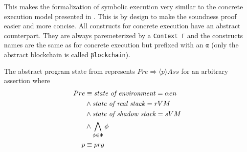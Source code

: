 \begin{comment}
These rules never affect the goal formula to be asserted, and because
(which must always be given), and $Ass$ can be any formula.
Our construct specifys $Pre \Longrightarrow \langle p \rangle$ but not $Ass$ since it
neither changes, nor has any implications for the validity of our rules
\draft{other than the premisse holds with $Ass$ \emph{iff} the conclusion holds with it (i guess)}.

This matches the sequent rule (R8) from \todo{cite lecture notes 2010}
for functional Michelson instructions, since here $x$ will be the new top stack element,
which our DL always represents with a new variable, thus $\phi_x^{\hat{x}} \equiv \phi$.
\todo{not sure about control flow instructions \ldots}

We will proof the soundness of these rules by showing that
if an interpretation for $Pre$ is a valid interpretation for a concrete execution state
with $i ; p$ left to be executed
(i.e. stack values match and $Pre$ otherwise doesn't contradict itself),
we can give an extension of that interpretation
such that $I \land Pre'$ is a valid interpretation of the concrete state after execution of $i$.

Since the extension of the interpretation is only for possible new variables that are not present
in $Ass$, it follows from our soundness proof \draft{that our calculus is sound \ldots}.
\end{comment}

This makes the formalization of symbolic execution very similar to the concrete execution model
presented in .
This is by design to make the soundness proof easier and more concise.
All constructs for concrete execution have an abstract counterpart.
They are always paremeterized by a \verb/Context Γ/ and the constructs names are the same as for
concrete execution but prefixed with an \verb/α/
(only the abstract blockchain is called \verb/βlockchain/).

The abstract program state from 
represents $Pre \Longrightarrow \langle p \rangle Ass$ for an arbitrary assertion where
\begin{align*}
	Pre	&\equiv	\text{\emph{state of environment}} = \alpha en
\\		&\land	\text{\emph{state of real stack}} = rVM
\\		&\land	\text{\emph{state of shadow stack}} = sVM
\\		&\land	\bigwedge_{\phi \in \Phi} \phi
\\	p	&\equiv	prg
\end{align*}

